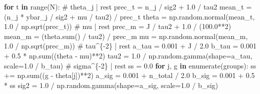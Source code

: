 \documentclass[
  letterpaper,
  DIV=11,
  numbers=noendperiod]{scrartcl}
\newenvironment{Shaded}{\begin{snugshade}}{\end{snugshade}}
\newcommand{\BuiltInTok}[1]{\textcolor[rgb]{0.00,0.23,0.31}{#1}}
\newcommand{\CommentTok}[1]{\textcolor[rgb]{0.37,0.37,0.37}{#1}}
\newcommand{\ControlFlowTok}[1]{\textcolor[rgb]{0.00,0.23,0.31}{\textbf{#1}}}
\newcommand{\DecValTok}[1]{\textcolor[rgb]{0.68,0.00,0.00}{#1}}
\newcommand{\FloatTok}[1]{\textcolor[rgb]{0.68,0.00,0.00}{#1}}
\newcommand{\KeywordTok}[1]{\textcolor[rgb]{0.00,0.23,0.31}{\textbf{#1}}}
\newcommand{\NormalTok}[1]{\textcolor[rgb]{0.00,0.23,0.31}{#1}}
\newcommand{\OperatorTok}[1]{\textcolor[rgb]{0.37,0.37,0.37}{#1}}
\begin{document}
\begin{Shaded}
\begin{Highlighting}[]
\ControlFlowTok{for}\NormalTok{ t }\KeywordTok{in} \BuiltInTok{range}\NormalTok{(N):}
    \CommentTok{\# theta\_j | rest}
\NormalTok{    prec\_t }\OperatorTok{=}\NormalTok{ n\_j }\OperatorTok{/}\NormalTok{ sig2 }\OperatorTok{+} \FloatTok{1.0} \OperatorTok{/}\NormalTok{ tau2}
\NormalTok{    mean\_t }\OperatorTok{=}\NormalTok{ (n\_j }\OperatorTok{*}\NormalTok{ ybar\_j }\OperatorTok{/}\NormalTok{ sig2 }\OperatorTok{+}\NormalTok{ mu }\OperatorTok{/}\NormalTok{ tau2) }\OperatorTok{/}\NormalTok{ prec\_t}
\NormalTok{    theta  }\OperatorTok{=}\NormalTok{ np.random.normal(mean\_t, }\FloatTok{1.0} \OperatorTok{/}\NormalTok{ np.sqrt(prec\_t))}
    \CommentTok{\# mu | rest}
\NormalTok{    prec\_m }\OperatorTok{=}\NormalTok{ J }\OperatorTok{/}\NormalTok{ tau2 }\OperatorTok{+} \FloatTok{1.0} \OperatorTok{/}\NormalTok{ (}\FloatTok{100.0}\OperatorTok{**}\DecValTok{2}\NormalTok{)}
\NormalTok{    mean\_m }\OperatorTok{=}\NormalTok{ (theta.}\BuiltInTok{sum}\NormalTok{() }\OperatorTok{/}\NormalTok{ tau2) }\OperatorTok{/}\NormalTok{ prec\_m}
\NormalTok{    mu }\OperatorTok{=}\NormalTok{ np.random.normal(mean\_m, }\FloatTok{1.0} \OperatorTok{/}\NormalTok{ np.sqrt(prec\_m))}
    \CommentTok{\# tau\^{}\{{-}2\} | rest}
\NormalTok{    a\_tau }\OperatorTok{=} \FloatTok{0.001} \OperatorTok{+}\NormalTok{ J }\OperatorTok{/} \FloatTok{2.0}
\NormalTok{    b\_tau }\OperatorTok{=} \FloatTok{0.001} \OperatorTok{+} \FloatTok{0.5} \OperatorTok{*}\NormalTok{ np.}\BuiltInTok{sum}\NormalTok{((theta }\OperatorTok{{-}}\NormalTok{ mu)}\OperatorTok{**}\DecValTok{2}\NormalTok{)}
\NormalTok{    tau2  }\OperatorTok{=} \FloatTok{1.0} \OperatorTok{/}\NormalTok{ np.random.gamma(shape}\OperatorTok{=}\NormalTok{a\_tau, scale}\OperatorTok{=}\FloatTok{1.0} \OperatorTok{/}\NormalTok{ b\_tau)}
    \CommentTok{\# sigma\^{}\{{-}2\} | rest}
\NormalTok{    ss }\OperatorTok{=} \FloatTok{0.0}
    \ControlFlowTok{for}\NormalTok{ j, g }\KeywordTok{in} \BuiltInTok{enumerate}\NormalTok{(groups):}
\NormalTok{        ss }\OperatorTok{+=}\NormalTok{ np.}\BuiltInTok{sum}\NormalTok{((g }\OperatorTok{{-}}\NormalTok{ theta[j])}\OperatorTok{**}\DecValTok{2}\NormalTok{)}
\NormalTok{    a\_sig }\OperatorTok{=} \FloatTok{0.001} \OperatorTok{+}\NormalTok{ n\_total }\OperatorTok{/} \FloatTok{2.0}
\NormalTok{    b\_sig }\OperatorTok{=} \FloatTok{0.001} \OperatorTok{+} \FloatTok{0.5} \OperatorTok{*}\NormalTok{ ss}
\NormalTok{    sig2  }\OperatorTok{=} \FloatTok{1.0} \OperatorTok{/}\NormalTok{ np.random.gamma(shape}\OperatorTok{=}\NormalTok{a\_sig, scale}\OperatorTok{=}\FloatTok{1.0} \OperatorTok{/}\NormalTok{ b\_sig)}


\end{Highlighting}
\end{Shaded}
\end{document}
